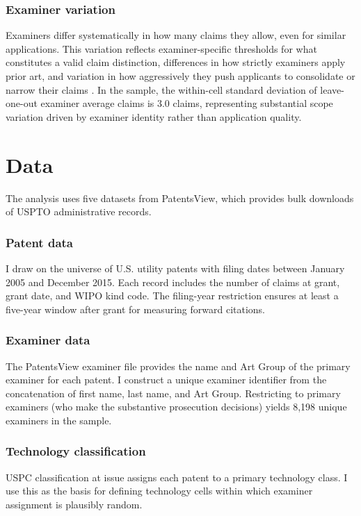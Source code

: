 \documentclass[12pt]{article}
\begin{document}
\subsubsection*{Examiner variation} Examiners differ systematically in how many claims they allow, even for similar applications. This variation reflects examiner-specific thresholds for what constitutes a valid claim distinction, differences in how strictly examiners apply prior art, and variation in how aggressively they push applicants to consolidate or narrow their claims \citep{lemley2001,cockburn2003}. In the sample, the within-cell standard deviation of leave-one-out examiner average claims is 3.0 claims, representing substantial scope variation driven by examiner identity rather than application quality.

\section{Data}

The analysis uses five datasets from PatentsView, which provides bulk downloads of USPTO administrative records.

\subsubsection*{Patent data} I draw on the universe of U.S. utility patents with filing dates between January 2005 and December 2015. Each record includes the number of claims at grant, grant date, and WIPO kind code. The filing-year restriction ensures at least a five-year window after grant for measuring forward citations.

\subsubsection*{Examiner data} The PatentsView examiner file provides the name and Art Group of the primary examiner for each patent. I construct a unique examiner identifier from the concatenation of first name, last name, and Art Group. Restricting to primary examiners (who make the substantive prosecution decisions) yields 8,198 unique examiners in the sample.

\subsubsection*{Technology classification} USPC classification at issue assigns each patent to a primary technology class. I use this as the basis for defining technology cells within which examiner assignment is plausibly random.
\end{document}
